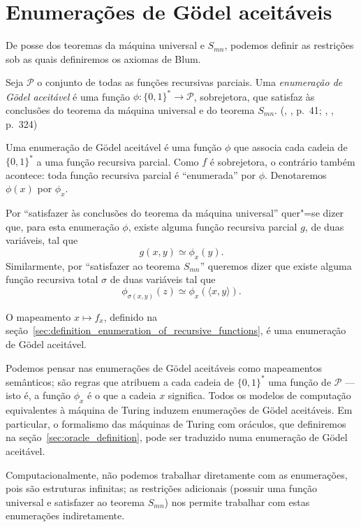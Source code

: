 \section{Enumerações de Gödel aceitáveis}
\label{sec:acceptable_godel_numbering}

De posse dos teoremas da máquina universal e $S_{mn}$,
podemos definir as restrições sob as quais definiremos os axiomas de Blum.

\begin{definition}
    Seja $\mathcal P$ o conjunto de todas as funções recursivas parciais.
    Uma \emph{enumeração de Gödel aceitável}
    é uma função $\phi: \{0, 1\}^* \to \mathcal P$, sobrejetora,
    que satisfaz às conclusões do teorema da máquina universal
    e do teorema $S_{mn}$.
    (\citeauthor{Rogers1987}, \citeyear{Rogers1987}, p.~41;
    \citeauthor{Blum1967}, \citeyear{Blum1967}, p.~324)
\end{definition}

Uma enumeração de Gödel aceitável é uma função $\phi$ que associa
cada cadeia de $\{0, 1\}^*$ a uma função recursiva parcial.
Como $f$ é sobrejetora,
o contrário também acontece:
toda função recursiva parcial é ``enumerada'' por $\phi$.
Denotaremos $\phi(x)$ por $\phi_x$.

Por ``satisfazer às conclusões do teorema da máquina universal''
quer"=se dizer que,
para esta enumeração $\phi$,
existe alguma função recursiva parcial $g$, de duas variáveis,
tal que
\begin{equation*}
    g(x, y) \simeq \phi_x(y).
\end{equation*}
Similarmente, por ``satisfazer ao teorema $S_{mn}$'' queremos dizer que
existe alguma função recursiva total $\sigma$ de duas variáveis tal que
\begin{equation*}
    \phi_{\sigma(x, y)}(z) \simeq \phi_x(\langle x, y \rangle).
\end{equation*}

\begin{example}
    O mapeamento $x \mapsto f_x$,
    definido na seção~\ref{sec:definition_enumeration_of_recursive_functions},
    é uma enumeração de Gödel aceitável.
\end{example}

Podemos pensar nas enumerações de Gödel aceitáveis
como mapeamentos semânticos;
são regras que atribuem a cada cadeia de $\{0, 1\}^*$
uma função de $\mathcal P$ --- isto é,
a função $\phi_x$ é o que a cadeia $x$ significa.
Todos os modelos de computação equivalentes à máquina de Turing
induzem enumerações de Gödel aceitáveis.
Em particular,
o formalismo das máquinas de Turing com oráculos,
que definiremos na seção~\ref{sec:oracle_definition},
pode ser traduzido numa enumeração de Gödel aceitável.

Computacionalmente,
não podemos trabalhar diretamente com as enumerações,
pois são estruturas infinitas;
as restrições adicionais
(possuir uma função universal e satisfazer ao teorema $S_{mn}$)
nos permite trabalhar com estas enumerações indiretamente.
